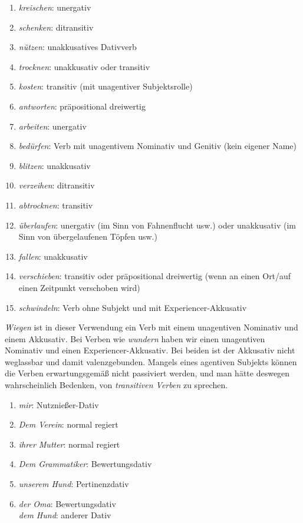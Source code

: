 \begin{enumerate}\Lf
  \item \textit{kreischen}: unergativ
  \item \textit{schenken}: ditransitiv
  \item \textit{nützen}: unakkusatives Dativverb
  \item \textit{trocknen}: unakkusativ oder transitiv
  \item \textit{kosten}: transitiv (mit unagentiver Subjektsrolle)
  \item \textit{antworten}: präpositional dreiwertig
  \item \textit{arbeiten}: unergativ
  \item \textit{bedürfen}: Verb mit unagentivem Nominativ und Genitiv (kein eigener Name)
  \item \textit{blitzen}: unakkusativ
  \item \textit{verzeihen}: ditransitiv
  \item \textit{abtrocknen}: transitiv
  \item \textit{überlaufen}: unergativ (im Sinn von Fahnenflucht usw.) oder unakkusativ (im Sinn von übergelaufenen Töpfen usw.)
  \item \textit{fallen}: unakkusativ
  \item \textit{verschieben}: transitiv oder präpositional dreiwertig (wenn an einen Ort\slash auf einen Zeitpunkt verschoben wird)
  \item \textit{schwindeln}: Verb ohne Subjekt und mit Experiencer-Akkusativ
\end{enumerate}


\textit{Wiegen} ist in dieser Verwendung ein Verb mit einem unagentiven Nominativ und einem Akkusativ.
Bei Verben wie \textit{wundern} haben wir einen unagentiven Nominativ und einen Experiencer-Akkusativ.
Bei beiden ist der Akkusativ nicht weglassbar und damit valenzgebunden.
Mangels eines agentiven Subjekts können die Verben erwartungsgemäß nicht passiviert werden, und man hätte deswegen wahrscheinlich Bedenken, von \textit{transitiven Verben} zu sprechen.


\begin{enumerate}\Lf
  \item \textit{mir}: Nutznießer-Dativ
  \item \textit{Dem Verein}: normal regiert
  \item \textit{ihrer Mutter}: normal regiert
  \item \textit{Dem Grammatiker}: Bewertungsdativ
  \item \textit{unserem Hund}: Pertinenzdativ
  \item \textit{der Oma}: Bewertungsdativ\\
    \textit{dem Hund}: anderer Dativ
\end{enumerate}

